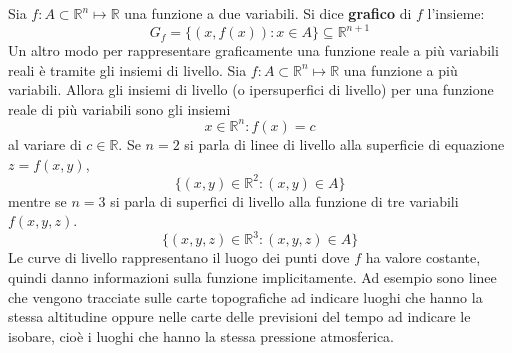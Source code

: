 \documentclass[a4paper]{article}
\numberwithin{equation}{subsection}
\begin{document}
\dfn{}
{
    Sia $f: A \subset \mathbb{R}^n \mapsto \mathbb{R}$ una funzione a due variabili. Si dice \textbf{grafico} di $f$ l'insieme:
    \[G_f = \{(x,f(x)) : x \in A\} \subseteq \mathbb{R}^{n+1}\]
}
Un altro modo per rappresentare graficamente una funzione reale a più variabili reali è tramite gli insiemi di livello.
\dfn{}
{
    Sia $f: A \subset \mathbb{R}^n \mapsto \mathbb{R}$ una funzione a più variabili. Allora gli insiemi di livello (o ipersuperfici di livello)
    per una funzione reale di più variabili sono gli insiemi
    \[x \in \mathbb{R}^n : f(x) = c\]
    al variare di $c \in \mathbb{R}$.
}
Se $n = 2$ si parla di linee di livello alla superficie di equazione $z = f(x,y)$, 
\[\{(x,y) \in \mathbb{R}^2 : (x,y) \in A\}\]
mentre se $n = 3$ si parla di superfici di livello alla funzione di tre variabili $f(x,y,z)$.
\[\{(x,y,z) \in \mathbb{R}^3 : (x,y,z) \in A\}\]
Le curve di livello rappresentano il luogo dei punti dove $f$ ha valore costante, 
quindi danno informazioni sulla funzione implicitamente. Ad esempio sono linee che vengono tracciate
sulle carte topografiche ad indicare luoghi che hanno la stessa altitudine oppure nelle carte delle previsioni del tempo
ad indicare le isobare, cioè i luoghi che hanno la stessa pressione atmosferica.
\end{document}
